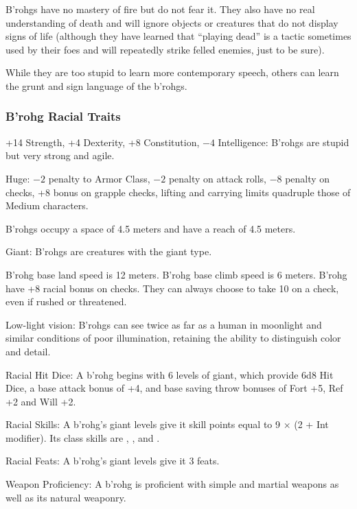 B'rohgs have no mastery of fire but do not fear it. They also have no real understanding of death and will ignore objects or creatures that do not display signs of life (although they have learned that ``playing dead'' is a tactic sometimes used by their foes and will repeatedly strike felled enemies, just to be sure).

While they are too stupid to learn more contemporary speech, others can learn the grunt and sign language of the b'rohgs.

\subsubsection{B'rohg Racial Traits}
\begin{itemize*}
    \item +14 Strength, +4 Dexterity, +8 Constitution, $-4$ Intelligence: B'rohgs are stupid but very strong and agile.
    \item Huge: $-2$ penalty to Armor Class, $-2$ penalty on attack rolls, $-8$ penalty on  checks, +8 bonus on grapple checks, lifting and carrying limits quadruple those of Medium characters.
    \item B'rohgs occupy a space of 4.5 meters and have a reach of 4.5 meters.
    \item Giant: B'rohgs are creatures with the giant type.
    \item B'rohg base land speed is 12 meters. B'rohg base climb speed is 6 meters. B'rohg have +8 racial bonus on  checks. They can always choose to take 10 on a  check, even if rushed or threatened.
    \item Low-light vision: B'rohgs can see twice as far as a human in moonlight and similar conditions of poor illumination, retaining the ability to distinguish color and detail.
    \item Racial Hit Dice: A b'rohg begins with 6 levels of giant, which provide 6d8 Hit Dice, a base attack bonus of +4, and base saving throw bonuses of Fort +5, Ref +2 and  Will +2.
    \item Racial Skills: A b'rohg's giant levels give it skill points equal to 9 $\times$ (2 + Int modifier). Its class skills are , ,  and .
    \item Racial Feats: A b'rohg's giant levels give it 3 feats.
    \item Weapon Proficiency: A b'rohg is proficient with simple and martial weapons as well as its natural weaponry.

\end{itemize*}
